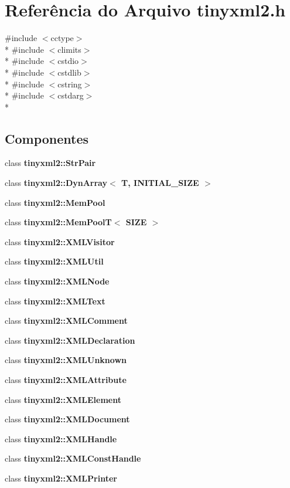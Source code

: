 \section{Referência do Arquivo tinyxml2.\+h}
\label{tinyxml2_8h}
{\ttfamily \#include $<$cctype$>$}\\*
{\ttfamily \#include $<$climits$>$}\\*
{\ttfamily \#include $<$cstdio$>$}\\*
{\ttfamily \#include $<$cstdlib$>$}\\*
{\ttfamily \#include $<$cstring$>$}\\*
{\ttfamily \#include $<$cstdarg$>$}\\*
\subsection*{Componentes}
\begin{DoxyCompactItemize}
\item 
class {\bf tinyxml2\+::\+Str\+Pair}
\item 
class {\bf tinyxml2\+::\+Dyn\+Array$<$ T, I\+N\+I\+T\+I\+A\+L\+\_\+\+S\+I\+Z\+E $>$}
\item 
class {\bf tinyxml2\+::\+Mem\+Pool}
\item 
class {\bf tinyxml2\+::\+Mem\+Pool\+T$<$ S\+I\+Z\+E $>$}
\item 
class {\bf tinyxml2\+::\+X\+M\+L\+Visitor}
\item 
class {\bf tinyxml2\+::\+X\+M\+L\+Util}
\item 
class {\bf tinyxml2\+::\+X\+M\+L\+Node}
\item 
class {\bf tinyxml2\+::\+X\+M\+L\+Text}
\item 
class {\bf tinyxml2\+::\+X\+M\+L\+Comment}
\item 
class {\bf tinyxml2\+::\+X\+M\+L\+Declaration}
\item 
class {\bf tinyxml2\+::\+X\+M\+L\+Unknown}
\item 
class {\bf tinyxml2\+::\+X\+M\+L\+Attribute}
\item 
class {\bf tinyxml2\+::\+X\+M\+L\+Element}
\item 
class {\bf tinyxml2\+::\+X\+M\+L\+Document}
\item 
class {\bf tinyxml2\+::\+X\+M\+L\+Handle}
\item 
class {\bf tinyxml2\+::\+X\+M\+L\+Const\+Handle}
\item 
class {\bf tinyxml2\+::\+X\+M\+L\+Printer}
\end{DoxyCompactItemize}

